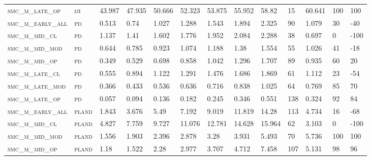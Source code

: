 \begin{landscape}
\begin{center}
\begin{footnotesize}
\begin{longtable}{lllllllllllll}
\textsc{smc\_m\_late\_op  } & \textsc{iji       }   & 43.987   & 47.935   & 50.666   & 52.323   & 53.875   & 55.952   & 58.82    & 15     & 60.641        & 100           & 100      \\
\textsc{smc\_m\_early\_all} & \textsc{pd        }   & 0.513    & 0.74     & 1.027    & 1.288    & 1.543    & 1.894    & 2.325    & 90     & 1.079         & 30            & -40      \\
\textsc{smc\_m\_mid\_cl   } & \textsc{pd        }   & 1.137    & 1.41     & 1.602    & 1.776    & 1.952    & 2.084    & 2.288    & 38     & 0.697         & 0             & -100     \\
\textsc{smc\_m\_mid\_mod  } & \textsc{pd        }   & 0.644    & 0.785    & 0.923    & 1.074    & 1.188    & 1.38     & 1.554    & 55     & 1.026         & 41            & -18      \\
\textsc{smc\_m\_mid\_op   } & \textsc{pd        }   & 0.349    & 0.529    & 0.698    & 0.858    & 1.042    & 1.296    & 1.707    & 89     & 0.935         & 60            & 20       \\
\textsc{smc\_m\_late\_cl  } & \textsc{pd        }   & 0.555    & 0.894    & 1.122    & 1.291    & 1.476    & 1.686    & 1.869    & 61     & 1.112         & 23            & -54      \\
\textsc{smc\_m\_late\_mod } & \textsc{pd        }   & 0.366    & 0.433    & 0.536    & 0.636    & 0.716    & 0.838    & 1.025    & 64     & 0.769         & 85            & 70       \\
\textsc{smc\_m\_late\_op  } & \textsc{pd        }   & 0.057    & 0.094    & 0.136    & 0.182    & 0.245    & 0.346    & 0.551    & 138    & 0.324         & 92            & 84       \\
\textsc{smc\_m\_early\_all} & \textsc{pland     }   & 1.843    & 3.676    & 5.49     & 7.192    & 9.019    & 11.819   & 14.28    & 113    & 4.734         & 16            & -68      \\
\textsc{smc\_m\_mid\_cl   } & \textsc{pland     }   & 4.827    & 7.759    & 9.727    & 11.076   & 12.781   & 14.628   & 15.964   & 62     & 3.103         & 0             & -100     \\
\textsc{smc\_m\_mid\_mod  } & \textsc{pland     }   & 1.556    & 1.903    & 2.396    & 2.878    & 3.28     & 3.931    & 5.493    & 70     & 5.736         & 100           & 100      \\
\textsc{smc\_m\_mid\_op   } & \textsc{pland     }   & 1.18     & 1.522    & 2.28     & 2.977    & 3.707    & 4.712    & 7.458    & 107    & 5.131         & 98            & 96       \\

\end{longtable}
\end{footnotesize}
\end{center}
\end{landscape}
